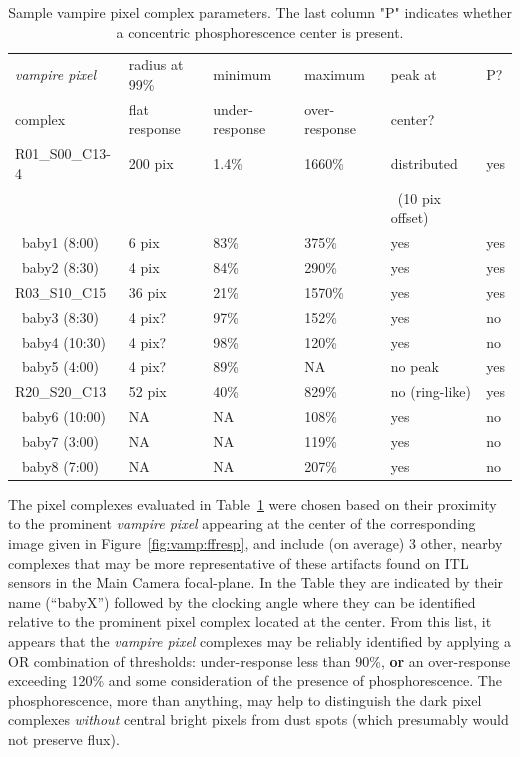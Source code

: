 \begin{table}[ht!]
\caption{Sample vampire pixel complex parameters. The last column "P" indicates whether a concentric phosphorescence center is present.}
\label{tab:vamp:samples}
\centering
\begin{tabular}{llllll}
\toprule
{\it vampire pixel}& radius at 99\% & minimum& maximum& peak at & P?\\
complex & flat response & under-response & over-response & center?\\
\midrule
R01\_S00\_C13-4 & 200 pix & 1.4\%&1660\% & distributed & yes\\
                &         &      &       &~(10 pix offset)&\\
~baby1 (8:00)   & 6 pix   & 83\% & 375\% & yes & yes \\
~baby2 (8:30)   & 4 pix   & 84\% & 290\% & yes & yes \\
R03\_S10\_C15   & 36 pix  & 21\% & 1570\%& yes & yes \\
~baby3 (8:30)   & 4 pix?  & 97\% & 152\% & yes & no \\
~baby4 (10:30)  & 4 pix?  & 98\% & 120\% & yes & no \\
~baby5 (4:00)   & 4 pix?  & 89\% & NA    & no peak & yes \\
R20\_S20\_C13   & 52 pix  & 40\% & 829\% & no (ring-like) & yes \\
~baby6 (10:00)  & NA      & NA   & 108\% & yes & no \\
~baby7 (3:00)   & NA      & NA   & 119\% & yes & no \\
~baby8 (7:00)   & NA      & NA   & 207\% & yes & no \\
\bottomrule
\end{tabular}
\end{table}


The pixel complexes evaluated in Table~\ref{tab:vamp:samples} were chosen based on their proximity to the prominent {\it vampire pixel} appearing at the center of the corresponding image given in Figure~\ref{fig:vamp:ffresp}, and include (on average) 3 other, nearby complexes that may be more representative of these artifacts found on ITL sensors in the Main Camera focal-plane. In the Table they are indicated by their name (``babyX'') followed by the clocking angle where they can be identified relative to the prominent pixel complex located at the center. From this list, it appears that the {\it vampire pixel} complexes may be reliably identified by applying a OR combination of thresholds: under-response less than 90\%, {\bf or} an over-response exceeding 120\% and some consideration of the presence of phosphorescence. The phosphorescence, more than anything, may help to distinguish the dark pixel complexes {\it without} central bright pixels from dust spots (which presumably would not preserve flux). 

